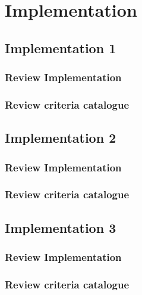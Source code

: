 
\graphicspath{{./sections/methology/assets}}

\chapter{Implementation}
\section{Implementation 1}
\subsection{Review Implementation}
\subsection{Review criteria catalogue}
\section{Implementation 2}
\subsection{Review Implementation}
\subsection{Review criteria catalogue}
\section{Implementation 3}
\subsection{Review Implementation}
\subsection{Review criteria catalogue}